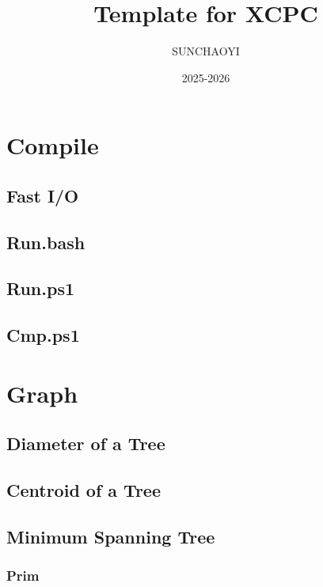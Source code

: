 \documentclass[a4paper]{article}
\title{Template for XCPC}
\author{SUNCHAOYI}
\date{2025-2026}
\begin{document}
\maketitle

\tableofcontents

\pagebreak

\section{Compile}

\subsection{Fast I/O}


\subsection{Run.bash}


\subsection{Run.ps1}


\subsection{Cmp.ps1}


\pagebreak

\section{Graph}

\subsection{Diameter of a Tree}


\subsection{Centroid of a Tree}


\subsection{Minimum Spanning Tree}

\subsubsection{Prim}

\end{document}
